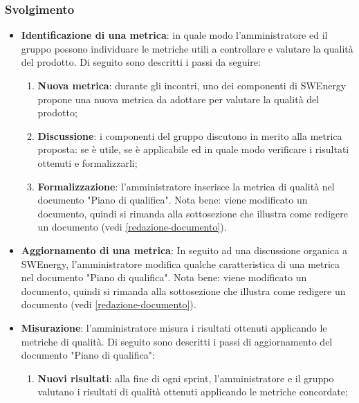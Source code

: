 \subsubsection{Svolgimento}
\begin{itemize}
	\item \textbf{Identificazione di una metrica}: in quale modo
	      l'amministratore ed il gruppo possono individuare le metriche utili a
	      controllare e valutare la qualità del prodotto. Di seguito sono
	      descritti i passi da seguire:
	      \begin{enumerate}
		      \item \textbf{Nuova metrica}: durante gli incontri, uno dei
		            componenti di SWEnergy propone una nuova metrica da adottare
		            per valutare la qualità del prodotto;

		      \item \textbf{Discussione}: i componenti del gruppo discutono in
		            merito alla metrica proposta: se è utile, se è applicabile
		            ed in quale modo verificare i risultati ottenuti e
		            formalizzarli;

		      \item \textbf{Formalizzazione}: l'amministratore inserisce la
		            metrica di qualità nel documento "Piano di qualifica". Nota
		            bene: viene modificato un documento, quindi si rimanda alla
		            sottosezione che illustra come redigere un documento
		            (vedi \cref{redazione-documento}).
	      \end{enumerate}

	\item \textbf{Aggiornamento di una metrica}: In seguito ad una discussione
	      organica a SWEnergy, l'amministratore modifica qualche caratteristica
	      di una metrica nel documento "Piano di qualifica". Nota bene:
	      viene modificato un documento, quindi si rimanda alla
	      sottosezione che illustra come redigere un documento
	      (vedi \cref{redazione-documento}).

	\item \textbf{Misurazione}: l'amministratore misura i risultati ottenuti
	      applicando le metriche di qualità. Di seguito sono descritti i passi
	      di aggiornamento del documento "Piano di qualifica":
	      \begin{enumerate}
		      \item \textbf{Nuovi risultati}: alla fine di ogni sprint,
		            l'amministratore e il gruppo valutano i risultati di qualità
		            ottenuti applicando le metriche concordate;


\end{enumerate}
\end{itemize}
